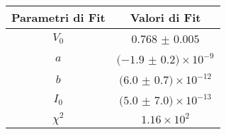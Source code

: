 \begin{tabular}{cc}
\hline
	Parametri di Fit & Valori di Fit\\ 
\hline
	$V_0$ & $0.768$ $\pm$ $0.005$ \\
	$a$ & $(-1.9$ $\pm$ $0.2)\times 10^{-9}$ \\
	$b$ & $(6.0$ $\pm$ $0.7)\times 10^{-12}$ \\
	$I_0$ & $(5.0$ $\pm$ $7.0)\times 10^{-13}$ \\
	$\chi^2$ & $1.16\times 10^{2}$ \\
\hline
\end{tabular}

